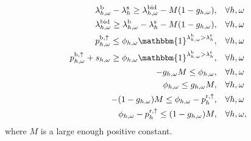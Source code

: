 \begin{subequations}\label{eq:bid_constraint_relaxed}
    \begin{align}
        \lambda_{h,\omega}^{\rm{b}} - \lambda_{h}^{\rm{s}} \geq \lambda_{h,\omega}^{\rm{bid}} - M  (1 - g_{h,\omega}) , \quad                        & \forall{h,\omega}             \label{con_bid:subeq1}  \\
        \lambda_{h,\omega}^{\rm{bid}} \geq \lambda_{h,\omega}^{\rm{b}} - \lambda_{h}^{\rm{s}} - M  (1 - g_{h,\omega}) , \quad                        & \forall{h,\omega}             \label{con_bid:subeq2}  \\
        p^{\rm{b}, \uparrow}_{h,\omega} \leq \phi_{h,\omega}  \mathbbm{1}^{\lambda^{\rm{b}}_{h,\omega} > \lambda^{\rm{s}}_{h}}, \quad                & \forall{{h,\omega}}           \label{con_bid:subeq3}  \\
        p^{\rm{b}, \uparrow}_{h,\omega} + s_{h,\omega} \geq \phi_{h,\omega}  \mathbbm{1}^{\lambda^{\rm{b}}_{h,\omega} > \lambda^{\rm{s}}_{h}}, \quad & \forall{{h,\omega}}           \label{con_bid:subeq4}  \\
        -g_{h,\omega}  M \leq \phi_{h,\omega}, \quad                                                                                                 & \forall{h,\omega}             \label{con_bid:subeq5}  \\
        \phi_{h,\omega} \leq g_{h,\omega}  M, \quad                                                                                                  & \forall{h,\omega}             \label{con_bid:subeq6}  \\
        -(1 - g_{h,\omega})  M \leq \phi_{h,\omega} - p^{\rm{r},\uparrow}_{h}, \quad                                                                 & \forall{h,\omega}             \label{con_bid:subeq7}  \\
        \phi_{h,\omega} - p^{\rm{r},\uparrow}_{h} \leq (1 - g_{h,\omega})  M, \quad                                                                  & \forall{h,\omega},             \label{con_bid:subeq8}
    \end{align}
\end{subequations}
where $M$ is a large enough positive constant.
